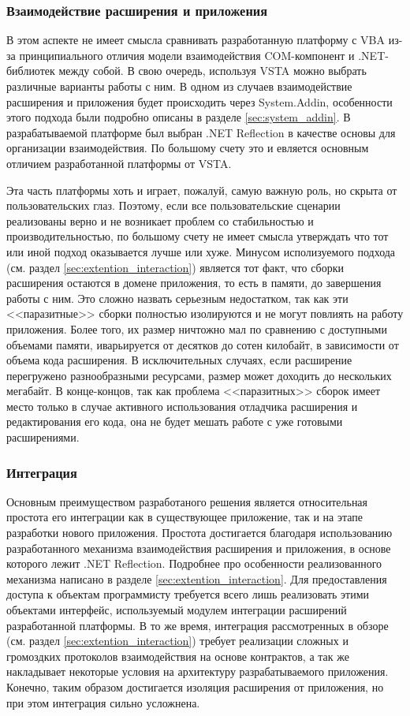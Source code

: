 \subsubsection{Взаимодействие расширения и приложения}

В этом аспекте не имеет смысла сравнивать разработанную платформу с VBA из-за принципиального отличия модели взаимодействия COM-компонент и .NET-библиотек между собой. В свою очередь, используя VSTA можно выбрать различные варианты работы с ним. В одном из случаев взаимодействие расширения и приложения будет происходить через System.Addin, особенности этого подхода были подробно описаны в разделе \ref{sec:system_addin}. В разрабатываемой платформе был выбран .NET Reflection в качестве основы для организации взаимодействия. По большому счету это и евляется основным отличием разработанной платформы от VSTA.

Эта часть платформы хоть и играет, пожалуй, самую важную роль, но скрыта от пользовательских глаз. Поэтому, если все пользовательские сценарии реализованы верно и не возникает проблем со стабильностью и производительностью, по большому счету не имеет смысла утверждать что тот или иной подход оказывается лучше или хуже. Минусом исполизуемого подхода (см. раздел \ref{sec:extention_interaction}) является тот факт, что сборки расширения остаются в домене приложения, то есть в памяти, до завершения работы с ним. Это сложно назвать серьезным недостатком, так как эти <<паразитные>> сборки полностью изолируются и не могут повлиять на работу приложения. Более того, их размер ничтожно мал по сравнению с доступными объемами памяти, иварьируется от десятков до сотен килобайт, в зависимости от объема кода расширения. В исключительных случаях, если расширение перегружено разнообразными ресурсами, размер может доходить до нескольких мегабайт. В конце-концов, так как проблема <<паразитных>> сборок имеет место только в случае активного использования отладчика расширения и редактирования его кода, она не будет мешать работе с уже готовыми расширениями.

\subsubsection{Интеграция}

Основным преимуществом разработаного решения является относительная простота его интеграции как в существующее приложение, так и на этапе разработки нового приложения. Простота достигается благодаря использованию разработанного механизма взаимодействия расширения и приложения, в основе которого лежит .NET Reflection. Подробнее про особенности реализованного механизма написано в разделе \ref{sec:extention_interaction}. Для предоставления доступа к объектам программисту требуется всего лишь реализовать этими объектами интерфейс, используемый модулем интеграции расширений разработанной платформы. В то же время, интеграция рассмотренных в обзоре (см. раздел \ref{sec:extention_interaction}) требует реализации сложных и громоздких протоколов взаимодействия на основе контрактов, а так же накладывает некоторые условия на архитектуру разрабатываемого приложения. Конечно, таким образом достигается изоляция расширения от приложения, но при этом интеграция сильно усложнена.

